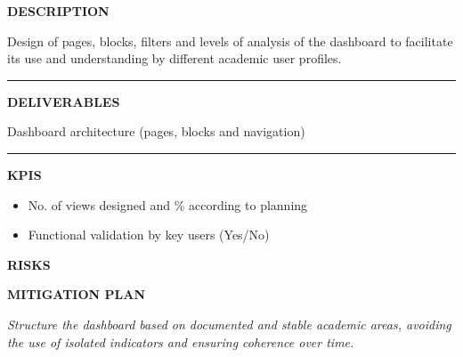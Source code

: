 \documentclass[11pt,a4paper]{scrreprt}
\newcommand{\fieldlabel}[1]{%
  {\footnotesize\sffamily\bfseries\color{mutedcolor}\MakeUppercase{#1}}\par\nopagebreak[4]
}
\newcommand{\fieldsep}{\vspace{3pt}\noindent\textcolor{bordercolor}{\rule{\linewidth}{0.4pt}}\vspace{3pt}\par}
\begin{document}
\begin{tcolorbox}[pabox={dashcolor}{A.P.1.2 \enspace\textbullet\enspace Design of the Functional Structure of the Dashboard}]

\fieldlabel{Description}
{\small Design of pages, blocks, filters and levels of analysis of the dashboard to facilitate its use and understanding by different academic user profiles.}\par
\fieldsep
\fieldlabel{Deliverables}
{\small Dashboard architecture (pages, blocks and navigation)}\par
\fieldsep
\fieldlabel{KPIs}
{\small \begin{itemize}[noitemsep,topsep=2pt]
\item No. of views designed and \% according to planning
\item Functional validation by key users (Yes/No)
\end{itemize}}\par
\end{tcolorbox}
\begin{tcolorbox}[riskbox]
{\footnotesize\sffamily\bfseries\color{red!50!black} RISKS}\par{}
\end{tcolorbox}
\begin{tcolorbox}[mitbox]
{\footnotesize\sffamily\bfseries\color{green!40!black} MITIGATION PLAN}\par{}
\end{tcolorbox}
\vspace{8pt}

\newpage
{}
{\small\color{mutedcolor}\itshape Structure the dashboard based on documented and stable academic areas, avoiding the use of isolated indicators and ensuring coherence over time.}\par\vspace{6pt}
\end{document}
